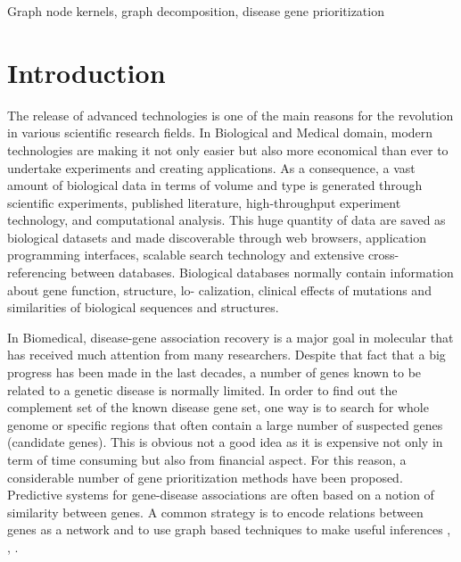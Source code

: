 \documentclass[review]{elsarticle}
\begin{document}
\begin{frontmatter}
\begin{keyword}
Graph node kernels, graph decomposition, disease gene prioritization
\end{keyword}
\end{frontmatter}

\linenumbers
\section{Introduction}
The release of advanced technologies is one of the main reasons for the
revolution in various scientific research fields. In Biological and Medical
domain, modern technologies are making it not only easier but also more
economical than ever to undertake experiments and creating applications.
As a consequence, a vast amount of biological data in terms of volume
and type is generated through scientific experiments, published literature,
high-throughput experiment technology, and computational analysis. This
huge quantity of data are saved as biological datasets and made discoverable
through web browsers, application programming interfaces, scalable search
technology and extensive cross-referencing between databases. Biological
databases normally contain information about gene function, structure, lo-
calization, clinical effects of mutations and similarities of biological sequences and structures.

In Biomedical, disease-gene association recovery is a major goal in molecular  that has received much attention from many researchers. Despite that fact that a big progress has been made in the last decades, a number of genes known to be related to a genetic disease is normally limited. In order to find out the complement set of the known disease gene set, one way is to search for whole genome or specific regions that often contain a large number of suspected genes (candidate genes). This is obvious not a good idea as it is expensive not only in term of time consuming but also from financial aspect. For this reason, a considerable number of gene prioritization methods have been proposed. Predictive systems for gene-disease associations are often based on a notion of similarity between genes. A common strategy is to encode relations between genes as a network and to use graph based techniques to make useful inferences \cite{mordelet2011prodige}, \cite{chen2014disease}, \cite{valentini2014extensive}.
\end{document}
